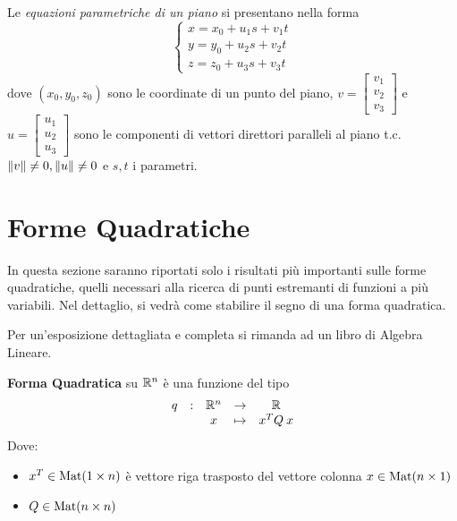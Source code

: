 \begin{appendices}
\par
Le \emph{equazioni parametriche di un piano} si presentano nella forma
\[
	\begin{cases}
		x = x_0 + u_1 s + v_1 t\\
		y = y_0 + u_2 s + v_2 t\\
		z = z_0 + u_3 s + v_3 t
	\end{cases}	
\]
dove $ (x_0, y_0, z_0) $ sono le coordinate di un punto del piano,
$ v = \begin{bmatrix} v_1 \\ v_2 \\ v_3 \end{bmatrix} $ e $ u = \begin{bmatrix} u_1 \\ u_2 \\ u_3 \end{bmatrix} $
sono le componenti di vettori direttori paralleli al piano t.c. $ \left\|v\right\| \neq 0, \left\|u\right\| \neq 0 $ e $s, t$ i parametri.

\newpage
\section{Forme Quadratiche}\label{sect:for_quadr}
In questa sezione saranno riportati solo i risultati più importanti sulle forme quadratiche,
quelli necessari alla ricerca di punti estremanti di funzioni a più variabili. Nel dettaglio, si vedrà come stabilire il segno di una forma quadratica.

Per un'esposizione dettagliata e completa si rimanda ad un libro di Algebra Lineare.

\begin{definition}
	\label{def:form_quadr}
	\textbf{Forma Quadratica} su $\mathbb{R}^n$ è una funzione del tipo
	\[\begin{array}{ccccc} {q} & : & {\mathbb{R}^n} & \to & {\mathbb{R}} \\ & & {x} & \mapsto & {x^T Q \: x} \\ \end{array}\]
	Dove:
	\begin{itemize}[noitemsep]
		\item $x^T \in \operatorname{Mat}(1 \times n)$ è vettore riga trasposto del vettore colonna $x \in \operatorname{Mat}(n \times 1)$
		\item $Q \in \operatorname{Mat}(n \times n)$
	\end{itemize}


\end{definition}
\end{appendices}

